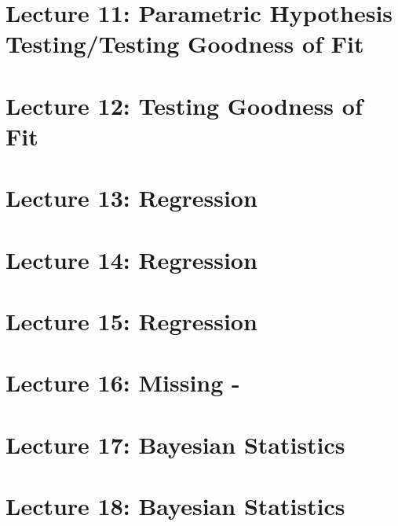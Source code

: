 \documentclass{article}
\begin{document}
\section{Lecture 11: Parametric Hypothesis Testing/Testing Goodness of Fit}


\section{Lecture 12: Testing Goodness of Fit}


\section{Lecture 13: Regression}


\section{Lecture 14: Regression}


\section{Lecture 15: Regression}


\section{Lecture 16: Missing -}

\section{Lecture 17: Bayesian Statistics}


\section{Lecture 18: Bayesian Statistics}

\end{document}
